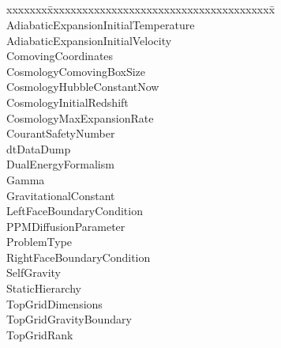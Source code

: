\documentclass{book}
\begin{document}
\subsection{\enzo}

{\parametersize
\begin{tabbing}
xxxxxxx\=xxxxxxxxxxxxxxxxxxxxxxxxxxxxxxxxxxxxxxx\=\kill
\> AdiabaticExpansionInitialTemperature   \\
\> AdiabaticExpansionInitialVelocity       \\
\> ComovingCoordinates                \\
\> CosmologyComovingBoxSize        \\
\> CosmologyHubbleConstantNow  \\
\> CosmologyInitialRedshift          \\
\> CosmologyMaxExpansionRate       \\
\> CourantSafetyNumber     \\
\> dtDataDump              \\
\> DualEnergyFormalism           \\
\> Gamma                   \\
\> GravitationalConstant             \\
\> LeftFaceBoundaryCondition          \\
\> PPMDiffusionParameter          \\
\> ProblemType                       \\
\> RightFaceBoundaryCondition  \\
\> SelfGravity                        \\
\> StaticHierarchy                \\
\> TopGridDimensions           \\
\> TopGridGravityBoundary             \\
\> TopGridRank                
\end{tabbing}}

\subsection{\cello}
\end{document}
